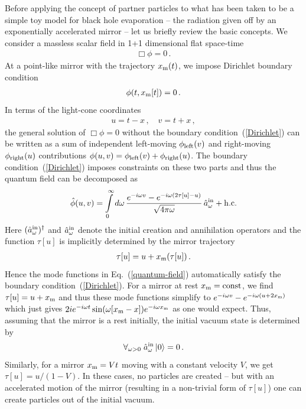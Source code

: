 \documentclass[aps,prd,showpacs,amssymb,nofootinbib,twocolumn]{revtex4}
\newcommand{\ket}[1]{\left|#1\right>}
\newcommand{\bea}{\begin{eqnarray}}
\newcommand{\ea}{\end{eqnarray}}
\begin{document}
Before applying the concept of partner particles to what has been taken to be 
a simple toy model for black hole evaporation -- the radiation given off by 
an exponentially accelerated mirror 
\cite{Davies+Fulling,Walker,Carlitz+Willey,wilczek} -- 
let us briefly review the basic concepts. 
%
We consider a massless scalar field in 1+1 dimensional flat space-time 
%
\bea
\Box\phi=0
\,.
\ea
%
At a point-like mirror with the trajectory $x_{\rm m}(t)$, we impose 
Dirichlet boundary condition 
%
\bea
\label{Dirichlet}
\phi(t,x_{\rm m}[t])=0
\,.
\ea
%
In terms of the light-cone coordinates 
%
\bea
u=t-x
\,,\quad
v=t+x
\,,
\ea
%
the general solution of $\Box\phi=0$ without the boundary 
condition~(\ref{Dirichlet}) can be written as a sum of independent 
left-moving $\phi_{\rm left}(v)$ and right-moving $\phi_{\rm right}(u)$
contributions 
$\phi(u,v)=\phi_{\rm left}(v)+\phi_{\rm right}(u)$.
%
The boundary condition~(\ref{Dirichlet}) imposes constraints 
on these two parts and thus the quantum field can be decomposed as 
%
\bea
\label{quantum-field}
\hat\phi(u,v)=
\int\limits_0^\infty
d\omega\,
\frac{e^{-i\omega v}-e^{-i\omega(2\tau[u]-u)}}{\sqrt{4\pi\omega}}\,
\hat a_\omega^{\rm in}
+{\rm h.c.}
\ea
%
Here  $(\hat a_\omega^{\rm in})^\dagger$ and $\hat a_\omega^{\rm in}$ 
denote the initial creation and annihilation operators and the function 
$\tau[u]$ is implicitly determined by the mirror trajectory 
%
\bea
\tau[u]=u+x_{\rm m}(\tau[u]) 
\,.
\ea
%
Hence the mode functions in Eq.~(\ref{quantum-field}) automatically satisfy 
the boundary condition~(\ref{Dirichlet}). 
%
For a mirror at rest $x_{\rm m}=\rm const$, we find $\tau[u]=u+x_{\rm m}$ 
and thus these mode functions simplify to 
$e^{-i\omega v}-e^{-i\omega(u+2x_{\rm m})}$ which just gives  
$2ie^{-i\omega t}\sin(\omega[x_{\rm m}-x])e^{-i\omega x_{\rm m}}$ 
as one would expect. 
%
Thus, assuming that the mirror is a rest initially, the initial vacuum state 
is determined by 
%
\bea
\label{vacuum}
\forall_{\omega>0}\;
\hat a_\omega^{\rm in}\ket{0}=0
\,.
\ea
%
Similarly, for a mirror $x_{\rm m}=Vt$ moving with a constant velocity $V$,
we get $\tau[u]=u/(1-V)$.
%
In these cases, no particles are created -- but with an accelerated motion 
of the mirror (resulting in a non-trivial form of $\tau[u]$) 
one can create particles out of the initial vacuum. 
\end{document}
